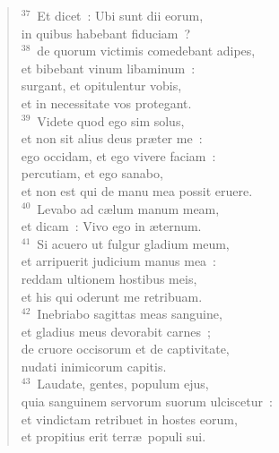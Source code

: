 \begin{flushleft}\begin{verse}${}^{37}$~Et dicet~: Ubi sunt dii eorum,\\ in quibus habebant fiduciam~?\\
${}^{38}$~de quorum victimis comedebant adipes,\\ et bibebant vinum libaminum~:\\ surgant, et opitulentur vobis,\\ et in necessitate vos protegant.\\
${}^{39}$~Videte quod ego sim solus,\\ et non sit alius deus pr\ae ter me~:\\ ego occidam, et ego vivere faciam~:\\ percutiam, et ego sanabo,\\ et non est qui de manu mea possit eruere.\\
${}^{40}$~Levabo ad c\ae lum manum meam,\\ et dicam~: Vivo ego in \ae ternum.\\
${}^{41}$~Si acuero ut fulgur gladium meum,\\ et arripuerit judicium manus mea~:\\ reddam ultionem hostibus meis,\\ et his qui oderunt me retribuam.\\
${}^{42}$~Inebriabo sagittas meas sanguine,\\ et gladius meus devorabit carnes~;\\ de cruore occisorum et de captivitate,\\ nudati inimicorum capitis.\\
${}^{43}$~Laudate, gentes, populum ejus,\\ quia sanguinem servorum suorum ulciscetur~:\\ et vindictam retribuet in hostes eorum,\\ et propitius erit terr\ae\ populi sui.\end{verse}\end{flushleft}


